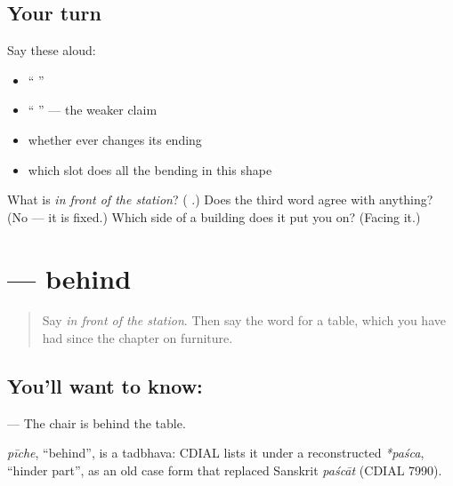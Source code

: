\subsection*{Your turn}
Say these aloud:

\begin{itemize}
\raggedright
  \item \textquotedblleft{}    \textquotedblright{}
  \item \textquotedblleft{}    \textquotedblright{} — the weaker claim
  \item whether \textbf{} ever changes its ending
  \item which slot does all the bending in this shape
\end{itemize}

\begin{tcolorbox}[breakable,colback=teal!4,colframe=teal!35!black,title={Before you move on}]
What is \emph{in front of the station}? (\textbf{  }.) Does the third word agree with anything? (No — it is fixed.) Which side of a building does it put you on? (Facing it.)
\end{tcolorbox}
\section[\texorpdfstring{\hi{के} \hi{पीछे} (ke pīche)}{के पीछे (ke pīche)}]{  — behind}

\label{lesson:HI-C93-ke-piichhe}



\begin{quote}
Say \emph{in front of the station}. Then say the word for a table, which you have had since the chapter on furniture.
\end{quote}

\subsection*{You'll want to know:  }
\textbf{    } — The chair is behind the table.

\begin{cousinweb}
\emph{pīche}, \textquotedblleft{}behind\textquotedblright{}, is a tadbhava: CDIAL lists it under a reconstructed \emph{*paśca}, \textquotedblleft{}hinder part\textquotedblright{}, as an old case form that replaced Sanskrit \emph{paścāt} (CDIAL 7990).
\end{cousinweb}

